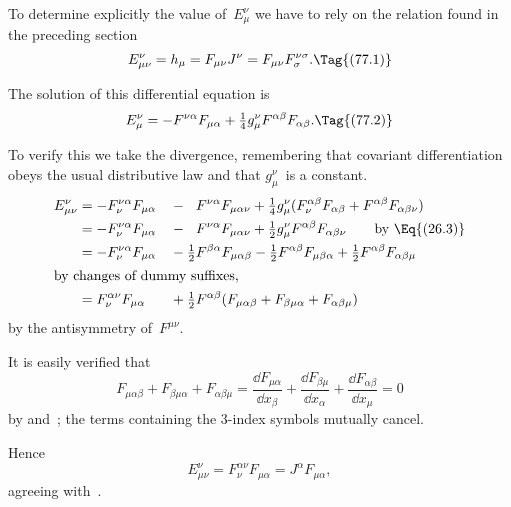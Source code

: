 \documentclass[12pt]{book}
\begin{document}
%
%

To determine explicitly the value of~$E_{\mu}^{\nu}$ we have to rely on the relation
found in the preceding section
\[
E_{\mu\nu}^{\nu} = h_{\mu} = F_{\mu\nu} J^{\nu} = F_{\mu\nu} F_{\sigma}^{\nu\sigma}.
\Tag{(77.1)}
\]

The solution of this differential equation is
\[
E_{\mu}^{\nu}  = -F^{\nu\alpha} F_{\mu\alpha} + \tfrac{1}{4} g_{\mu}^{\nu} F^{\alpha\beta} F_{\alpha\beta}.
\Tag{(77.2)}
\]

To verify this we take the divergence, remembering that covariant differentiation
obeys the usual distributive law and that $g_{\mu}^{\nu}$~is a constant.
\begin{alignat*}{2}
  E_{\mu\nu}^{\nu}
  &= -F_{\nu}^{\nu\alpha} F_{\mu\alpha}
  &&- \phantom{\tfrac{1}{2}} F^{\nu\alpha} F_{\mu\alpha\nu}
  + \tfrac{1}{4} g_{\mu}^{\nu}
     (F_{\nu}^{\alpha\beta} F_{\alpha\beta} +  F^{\alpha\beta} F_{\alpha\beta\nu}) \\
%
  &= -F_{\nu}^{\nu\alpha} F_{\mu\alpha}
  &&- \phantom{\tfrac{1}{2}} F^{\nu\alpha} F_{\mu\alpha\nu}
  + \tfrac{1}{2} g_{\mu}^{\nu} F^{\alpha\beta} F_{\alpha\beta\nu}
  \qquad\text{by~\Eq{(26.3)}} \\
%
  &= -F_{\nu}^{\nu\alpha} F_{\mu\alpha}
  &&- \tfrac{1}{2} F^{\beta\alpha} F_{\mu\alpha\beta}
    - \tfrac{1}{2} F^{\alpha\beta} F_{\mu\beta\alpha}
    + \tfrac{1}{2} F^{\alpha\beta} F_{\alpha\beta\mu} \\
\intertext{by changes of dummy suffixes,}
  &= F_{\nu}^{\alpha\nu} F_{\mu\alpha}
  &&+ \tfrac{1}{2} F^{\alpha\beta}(F_{\mu\alpha\beta} + F_{\beta\mu\alpha} + F_{\alpha\beta\mu})
\end{alignat*}
by the antisymmetry of~$F^{\mu\nu}$.

It is easily verified that
\[
F_{\mu\alpha\beta} + F_{\beta\mu\alpha} + F_{\alpha\beta\mu}
= \frac{\dd F_{\mu\alpha}}{\dd x_{\beta}}
+ \frac{\dd F_{\beta\mu}}{\dd x_{\alpha}}
+ \frac{\dd F_{\alpha\beta}}{\dd x_{\mu}} = 0
\]
by  and~; the terms containing the $3$-index symbols mutually
cancel.

Hence
\[
E_{\mu\nu}^{\nu} = F_{\nu}^{\alpha\nu} F_{\mu\alpha} = J^{\alpha} F_{\mu\alpha},
\]
agreeing with~.
\end{document}
